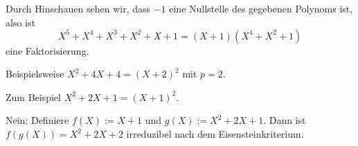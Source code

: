 \documentclass{algsheet}
\begin{document}
\begin{exercise}
 Durch Hinschauen sehen wir, dass $-1$ eine Nullstelle des gegebenen Polynoms ist, also ist
 \[X^5+X^4+X^3+X^2+X+1=(X+1)(X^4+X^2+1)\]
eine Faktorisierung.
\end{exercise}



\begin{exercise}
 Beispielsweise $X^2+4X+4=(X+2)^2$ mit $p=2$.
\end{exercise}


\begin{exercise}
 Zum Beispiel $X^2+2X+1=(X+1)^2$.
\end{exercise}



\begin{exercise}
 Nein: Definiere $f(X):=X+1$ und $g(X):=X^2+2X+1$. Dann ist $f(g(X))=X^2+2X+2$ irreduzibel nach dem Eisensteinkriterium.
\end{exercise}
\end{document}
